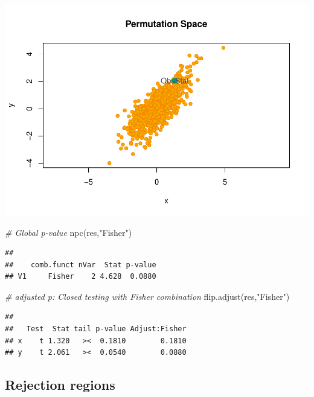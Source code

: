 \documentclass[
]{article}
\newenvironment{Shaded}{\begin{snugshade}}{\end{snugshade}}
\newcommand{\CommentTok}[1]{\textcolor[rgb]{0.56,0.35,0.01}{\textit{#1}}}
\newcommand{\FunctionTok}[1]{\textcolor[rgb]{0.00,0.00,0.00}{#1}}
\newcommand{\NormalTok}[1]{#1}
\newcommand{\StringTok}[1]{\textcolor[rgb]{0.31,0.60,0.02}{#1}}
\begin{document}
\begin{center}\includegraphics{perm_files/figure-latex/unnamed-chunk-35-2} \end{center}

\begin{Shaded}
\begin{Highlighting}[]
\CommentTok{\# Global p{-}value}
\FunctionTok{npc}\NormalTok{(res,}\StringTok{"Fisher"}\NormalTok{)}
\end{Highlighting}
\end{Shaded}

\begin{verbatim}
## 
##    comb.funct nVar  Stat p-value
## V1     Fisher    2 4.628  0.0880
\end{verbatim}

\begin{Shaded}
\begin{Highlighting}[]
\CommentTok{\# adjusted p: Closed testing with Fisher combination}
\FunctionTok{flip.adjust}\NormalTok{(res,}\StringTok{"Fisher"}\NormalTok{)}
\end{Highlighting}
\end{Shaded}

\begin{verbatim}
## 
##   Test  Stat tail p-value Adjust:Fisher
## x    t 1.320   ><  0.1810        0.1810
## y    t 2.061   ><  0.0540        0.0880
\end{verbatim}

\hypertarget{rejection-regions}{%
\subsection{Rejection regions}\label{rejection-regions}}
\end{document}

